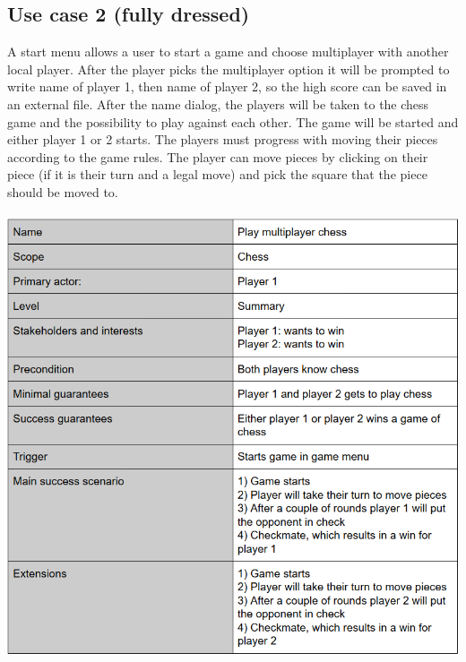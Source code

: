 \documentclass{article}
\begin{document}
        \subsection{Use case 2 (fully dressed)}
        A start menu allows a user to start a game and choose multiplayer with
        another local player. After the player picks the multiplayer option it
        will be prompted to write name of player 1, then name of player 2, so
        the high score can be saved in an external file. After the name dialog,
        the players will be taken to the chess game and the possibility to play
        against each other. The game will be started and either player 1 or 2 starts.
        The players must progress with moving their pieces according to the game rules.
        The player can move pieces by clicking on their piece (if it is their
        turn and a legal move) and pick the square that the piece should be moved
        to. \\ \\
        \includegraphics[width=\linewidth]{play-multiplayer.png}
\end{document}
